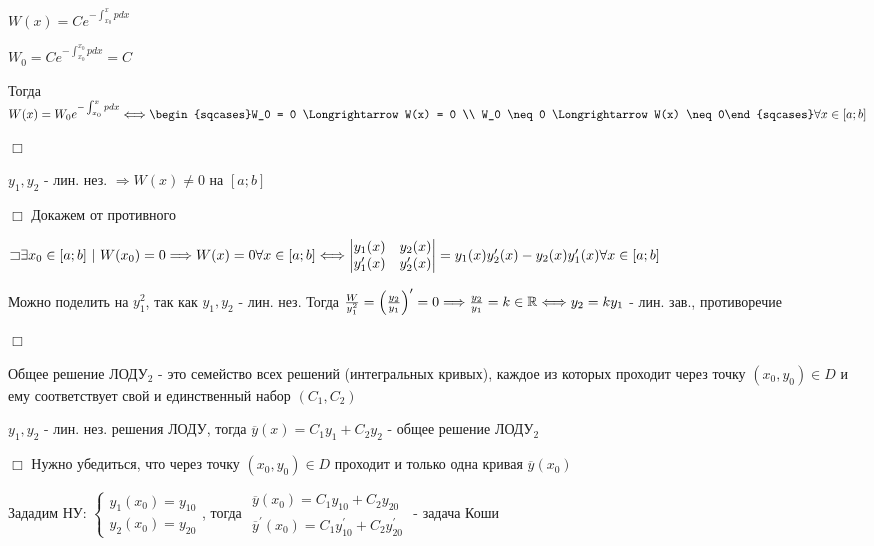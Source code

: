 \documentclass[12pt]{article}
\begin{document}
    $W(x) = Ce^{-\int_{x_0}^x pdx}$

    $W_0 = Ce^{-\int^{x_0}_{x_0} pdx} = C$

    Тогда $W(x) = W_0 e^{-\int_{x_0}^x pdx} \Longleftrightarrow \begin{sqcases}W_0 = 0 \Longrightarrow W(x) = 0 \\ W_0 \neq 0 \Longrightarrow W(x) \neq 0\end{sqcases} \forall x \in [a;b]$

    $\Box$

     $y_1, y_2$ - лин. нез. $\Longrightarrow W(x) \neq 0$ на $[a;b]$

    $\Box$ Докажем от противного

    $\letsymbol \exists x_0 \in [a;b] \ | \ W(x_0)= 0 \Longrightarrow W(x) = 0 \forall x \in [a;b] \Longleftrightarrow
    \begin{vmatrix}y_1(x) & y_2(x) \\ y_1^\prime(x) & y_2^\prime(x)\end{vmatrix} = y_1(x) y_2^\prime(x) - y_2(x) y_1^\prime(x) \forall x \in [a;b]$

    Можно поделить на $y_1^2$, так как $y_1, y_2$ - лин. нез. Тогда $\frac{W}{y^2_1} = \left(\frac{y_2}{y_1}\right)^\prime = 0 \Longrightarrow \frac{y_2}{y_1} = k \in \mathbb{R} \Longleftrightarrow y_2 = k y_1$ - лин. зав., противоречие

    $\Box$

    \Nota Общее решение ЛОДУ$_2$ - это семейство всех решений (интегральных кривых), каждое из которых проходит через точку
    $(x_0, y_0) \in D$ и ему соответствует свой и единственный набор $(C_1, C_2)$

     $y_1, y_2$ - лин. нез. решения ЛОДУ, тогда $\overline{y}(x) = C_1 y_1 + C_2 y_2$ - общее решение ЛОДУ$_2$

    $\Box$ Нужно убедиться, что через точку $(x_0, y_0) \in D$ проходит и только одна кривая $\overline{y}(x_0)$

    Зададим НУ: $\begin{cases}
                     y_1(x_0) = y_{10} \\
                     y_2(x_0) = y_{20}
    \end{cases}$, тогда $\begin{matrix}\overline{y}(x_0) = C_1 y_{10} + C_2 y_{20} \\ \overline{y}^\prime(x_0) = C_1 y_{10}^\prime + C_2 y_{20}^\prime\end{matrix}$ - задача Коши
\end{document}
